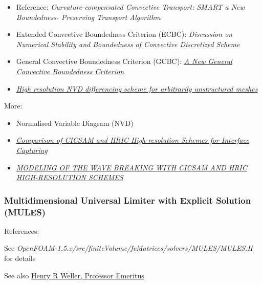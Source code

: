 \sloppy
\begin{itemize}
    \item Reference: \textit{Curvature-compensated Convective Transport: SMART a New Boundedness- Preserving Transport Algorithm}
    \item Extended Convective Boundedness Criterion (ECBC): \textit{Discussion on Numerical Stability and Boundedness of Convective Discretized Scheme}
    \item General Convective Boundedness Criterion (GCBC): \textit{\href{http://gr.xjtu.edu.cn:8080/upload/PUB.1673.4/Wei_NHT.pdf}{A New General Convective Boundedness Criterion}}
    \item {} \textit{\href{http://powerlab.fsb.hr/ped/kturbo/openfoam/papers/GammaPaper.pdf}{High resolution NVD differencing scheme for arbitrarily unstructured meshes}}
\end{itemize}
\fussy

More:
\begin{itemize}
    \item Normalised Variable Diagram (NVD)
    \item \textit{\href{http://warminski.pollub.plwww.ptmts.org.pl/Waclaw-Koron-2-08.pdf}{Comparison of CICSAM and HRIC High-resolution Schemes for Interface Capturing}}
    \item \textit{\href{http://proceedings.fyper.com/eccomascfd2006/documents/85.pdf}{MODELING OF THE WAVE BREAKING WITH CICSAM AND HRIC HIGH-RESOLUTION SCHEMES}}
\end{itemize}

\subsubsection{Multidimensional Universal Limiter with Explicit Solution (MULES)}

References: \citep{Berberovi2009,Kissling2010}

See \textit{OpenFOAM-1.5.x/src/finiteVolume/fvMatrices/solvers/MULES/MULES.H} for details

See also \href{http://fds.duke.edu/db/aas/Physics/weller}{Henry R Weller, Professor Emeritus}


